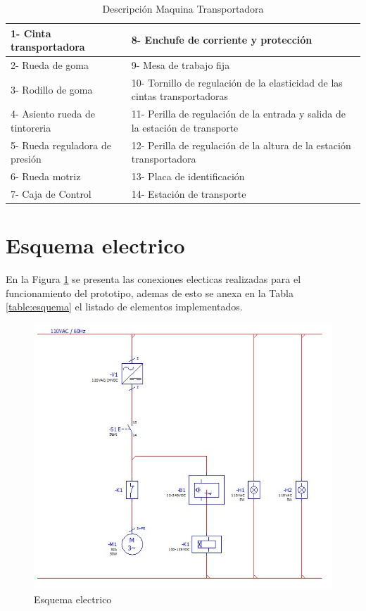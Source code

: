 		\begin{table}[ht]
			\centering
			\begin{tabular}{|p{5cm}|p{8cm}|}
				\hline
				1- Cinta transportadora & 8- Enchufe de corriente y protección \\ 
				\hline
				2- Rueda de goma& 9- Mesa de trabajo fija\\
				\hline
				3- Rodillo de goma& 10- Tornillo de regulación de la elasticidad de las cintas transportadoras\\
				\hline
				4- Asiento rueda de tintoreria& 11- Perilla de regulación de la entrada y salida de la estación de transporte\\
				\hline
				5- Rueda reguladora de presión& 12- Perilla de regulación de la altura de la estación transportadora\\
				\hline
				6- Rueda motriz& 13- Placa de identificación\\
				\hline
				7- Caja de Control& 14- Estación de transporte\\
				\hline
			\end{tabular}	
			\caption{Descripción Maquina Transportadora}
			\label{table:Banda}
		\end{table}

\newpage
	\section{Esquema electrico}
		En la Figura \ref{fig:Esquema} se presenta las conexiones electicas realizadas para el funcionamiento del prototipo, ademas de esto se anexa en la Tabla \ref{table:esquema} el listado de elementos implementados.  
		\begin{figure}[ht]
			\centering
			\includegraphics[scale=0.5]{Figs/66.jpg}
			\caption{Esquema electrico}
			\label{fig:Esquema}
		\end{figure}
	

